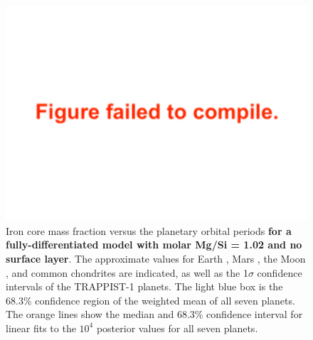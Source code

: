 \documentclass[twocolumn]{aastex63}
\begin{document}
\begin{figure}
    \centering
    \includegraphics[width=\hsize]{figures/Norm_cmf_vs_period.pdf}
    {Iron core mass fraction versus the planetary orbital periods \textbf{for a fully-differentiated model with molar Mg/Si = 1.02 and no surface layer}.  The approximate values for Earth \citep{McDonough2014}, Mars \citep{Khan2018}, the Moon \citep{Barr2016}, and common chondrites \citep{Palme2014} are indicated, as well as the 1$\sigma$ confidence intervals of the TRAPPIST-1 planets.
        The light blue box is the 68.3\% confidence region of the weighted mean of all seven planets. The orange lines show the median and 68.3\% confidence interval for linear fits to the $10^4$ posterior values for all seven planets.}
    \label{fig:cmf}
\end{figure}
\end{document}

